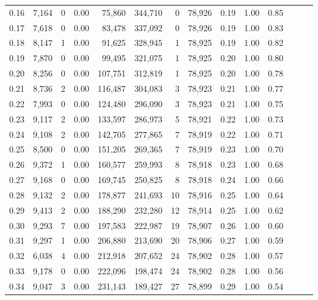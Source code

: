 \begin{tabular}{rrrrrrrrrrrrrr}
0.16 &  7,164 &      0 &  0.00 &   75,860 &  344,710 &       0 &  78,926 &  0.19 &  1.00 &      0.85 \\
0.17 &  7,618 &      0 &  0.00 &   83,478 &  337,092 &       0 &  78,926 &  0.19 &  1.00 &      0.83 \\
0.18 &  8,147 &      1 &  0.00 &   91,625 &  328,945 &       1 &  78,925 &  0.19 &  1.00 &      0.82 \\
0.19 &  7,870 &      0 &  0.00 &   99,495 &  321,075 &       1 &  78,925 &  0.20 &  1.00 &      0.80 \\
0.20 &  8,256 &      0 &  0.00 &  107,751 &  312,819 &       1 &  78,925 &  0.20 &  1.00 &      0.78 \\
0.21 &  8,736 &      2 &  0.00 &  116,487 &  304,083 &       3 &  78,923 &  0.21 &  1.00 &      0.77 \\
0.22 &  7,993 &      0 &  0.00 &  124,480 &  296,090 &       3 &  78,923 &  0.21 &  1.00 &      0.75 \\
0.23 &  9,117 &      2 &  0.00 &  133,597 &  286,973 &       5 &  78,921 &  0.22 &  1.00 &      0.73 \\
0.24 &  9,108 &      2 &  0.00 &  142,705 &  277,865 &       7 &  78,919 &  0.22 &  1.00 &      0.71 \\
0.25 &  8,500 &      0 &  0.00 &  151,205 &  269,365 &       7 &  78,919 &  0.23 &  1.00 &      0.70 \\
0.26 &  9,372 &      1 &  0.00 &  160,577 &  259,993 &       8 &  78,918 &  0.23 &  1.00 &      0.68 \\
0.27 &  9,168 &      0 &  0.00 &  169,745 &  250,825 &       8 &  78,918 &  0.24 &  1.00 &      0.66 \\
0.28 &  9,132 &      2 &  0.00 &  178,877 &  241,693 &      10 &  78,916 &  0.25 &  1.00 &      0.64 \\
0.29 &  9,413 &      2 &  0.00 &  188,290 &  232,280 &      12 &  78,914 &  0.25 &  1.00 &      0.62 \\
0.30 &  9,293 &      7 &  0.00 &  197,583 &  222,987 &      19 &  78,907 &  0.26 &  1.00 &      0.60 \\
0.31 &  9,297 &      1 &  0.00 &  206,880 &  213,690 &      20 &  78,906 &  0.27 &  1.00 &      0.59 \\
0.32 &  6,038 &      4 &  0.00 &  212,918 &  207,652 &      24 &  78,902 &  0.28 &  1.00 &      0.57 \\
0.33 &  9,178 &      0 &  0.00 &  222,096 &  198,474 &      24 &  78,902 &  0.28 &  1.00 &      0.56 \\
0.34 &  9,047 &      3 &  0.00 &  231,143 &  189,427 &      27 &  78,899 &  0.29 &  1.00 &      0.54 \\

\end{tabular}
